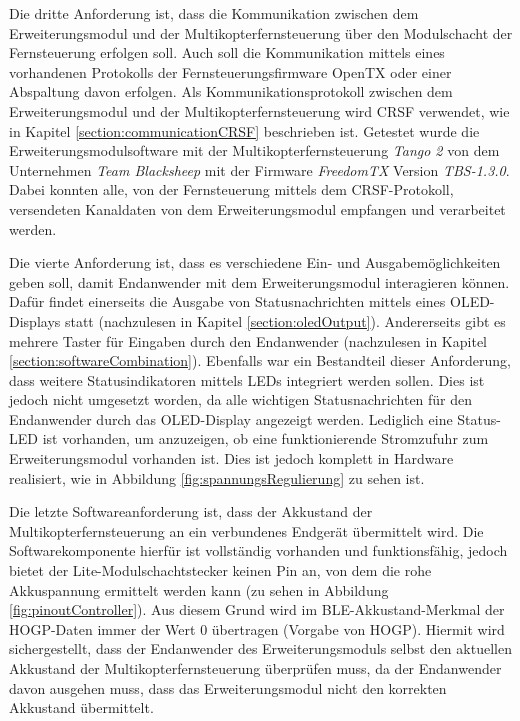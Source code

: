 Die dritte Anforderung ist, dass die Kommunikation zwischen dem Erweiterungsmodul und der Multikopterfernsteuerung über den Modulschacht der Fernsteuerung erfolgen soll. Auch soll die Kommunikation mittels eines vorhandenen Protokolls der Fernsteuerungsfirmware OpenTX oder einer Abspaltung davon erfolgen. Als Kommunikationsprotokoll zwischen dem Erweiterungsmodul und der Multikopterfernsteuerung wird CRSF verwendet, wie in Kapitel \ref{section:communicationCRSF} beschrieben ist. Getestet wurde die Erweiterungsmodulsoftware mit der Multikopterfernsteuerung \textit{Tango 2} von dem Unternehmen \textit{Team Blacksheep} mit der Firmware \textit{FreedomTX} Version \textit{TBS-1.3.0}. Dabei konnten alle, von der Fernsteuerung mittels dem CRSF-Protokoll, versendeten Kanaldaten von dem Erweiterungsmodul empfangen und verarbeitet werden.

Die vierte Anforderung ist, dass es verschiedene Ein- und Ausgabemöglichkeiten geben soll, damit Endanwender mit dem Erweiterungsmodul interagieren können. Dafür findet einerseits die Ausgabe von Statusnachrichten mittels eines \acs{OLED}-Displays statt (nachzulesen in Kapitel \ref{section:oledOutput}). Andererseits gibt es mehrere Taster für Eingaben durch den Endanwender (nachzulesen in Kapitel \ref{section:softwareCombination}). Ebenfalls war ein Bestandteil dieser Anforderung, dass weitere Statusindikatoren mittels \acsp{LED} integriert werden sollen. Dies ist jedoch nicht umgesetzt worden, da alle wichtigen Statusnachrichten für den Endanwender durch das \acs{OLED}-Display angezeigt werden. Lediglich eine Status-\acs{LED} ist vorhanden, um anzuzeigen, ob eine funktionierende Stromzufuhr zum Erweiterungsmodul vorhanden ist. Dies ist jedoch komplett in Hardware realisiert, wie in Abbildung \ref{fig:spannungsRegulierung} zu sehen ist.

Die letzte Softwareanforderung ist, dass der Akkustand der Multikopterfernsteuerung an ein verbundenes Endgerät übermittelt wird. Die Softwarekomponente hierfür ist vollständig vorhanden und funktionsfähig, jedoch bietet der Lite-Modulschachtstecker keinen Pin an, von dem die rohe Akkuspannung ermittelt werden kann (zu sehen in Abbildung \ref{fig:pinoutController}). Aus diesem Grund wird im \ac{BLE}-Akkustand-Merkmal der \ac{HOGP}-Daten immer der Wert 0 übertragen (Vorgabe von \ac{HOGP}). Hiermit wird sichergestellt, dass der Endanwender des Erweiterungsmoduls selbst den aktuellen Akkustand der Multikopterfernsteuerung überprüfen muss, da der Endanwender davon ausgehen muss, dass das Erweiterungsmodul nicht den korrekten Akkustand übermittelt.

